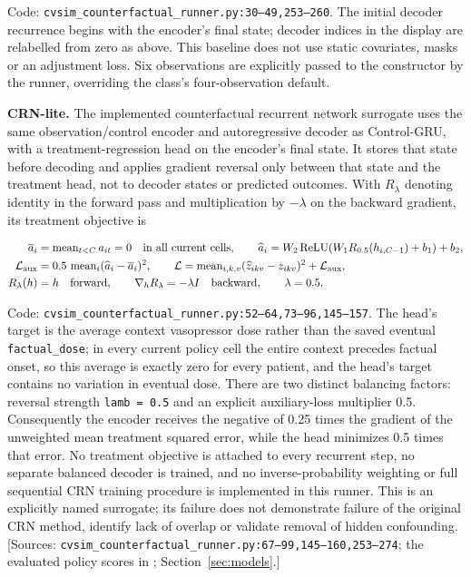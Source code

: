 Code: \texttt{cvsim\_\allowbreak{}counterfactual\_\allowbreak{}runner.\allowbreak{}py:\allowbreak{}30–\allowbreak{}49,\allowbreak{}253–\allowbreak{}260}. The initial decoder recurrence begins with the encoder's final state; decoder indices in the display are relabelled from zero as above. This baseline does not use static covariates, masks or an adjustment loss. Six observations are explicitly passed to the constructor by the runner, overriding the class's four-observation default.

\textbf{CRN-lite.} The implemented counterfactual recurrent network surrogate uses the same observation/control encoder and autoregressive decoder as Control-GRU, with a treatment-regression head on the encoder's final state. It stores that state before decoding and applies gradient reversal only between that state and the treatment head, not to decoder states or predicted outcomes. With \(R_\lambda\) denoting identity in the forward pass and multiplication by \(-\lambda\) on the backward gradient, its treatment objective is

\[
\begin{aligned}
\overline a_i&=\operatorname{mean}_{t<C}a_{it}=0\quad\text{in all current cells},\qquad
\widehat a_i=W_2\operatorname{ReLU}(W_1R_{0.5}(h_{i,C-1})+b_1)+b_2,\\
\mathcal L_{\rm aux}&=0.5\,\operatorname{mean}_i(\widehat a_i-\overline a_i)^2,\qquad
\mathcal L=\operatorname{mean}_{i,k,v}(\widehat z_{ikv}-z_{ikv})^2+\mathcal L_{\rm aux},\\
R_\lambda(h)&=h\quad\text{forward},\qquad
\nabla_h R_\lambda=-\lambda I\quad\text{backward},\qquad \lambda=0.5.
\end{aligned}
\]


Code: \texttt{cvsim\_\allowbreak{}counterfactual\_\allowbreak{}runner.\allowbreak{}py:\allowbreak{}52–\allowbreak{}64,\allowbreak{}73–\allowbreak{}96,\allowbreak{}145–\allowbreak{}157}. The head's target is the average context vasopressor dose rather than the saved eventual \texttt{factual\_dose}; in every current policy cell the entire context precedes factual onset, so this average is exactly zero for every patient, and the head's target contains no variation in eventual dose. There are two distinct balancing factors: reversal strength \texttt{lamb =\allowbreak{} 0.\allowbreak{}5} and an explicit auxiliary-loss multiplier 0.5. Consequently the encoder receives the negative of 0.25 times the gradient of the unweighted mean treatment squared error, while the head minimizes 0.5 times that error. No treatment objective is attached to every recurrent step, no separate balanced decoder is trained, and no inverse-probability weighting or full sequential CRN training procedure is implemented in this runner. This is an explicitly named surrogate; its failure does not demonstrate failure of the original CRN method, identify lack of overlap or validate removal of hidden confounding. [Sources: \texttt{cvsim\_\allowbreak{}counterfactual\_\allowbreak{}runner.\allowbreak{}py:\allowbreak{}67–\allowbreak{}99,\allowbreak{}145–\allowbreak{}160,\allowbreak{}253–\allowbreak{}274}; the evaluated policy scores in ; Section~\ref{sec:models}.]

